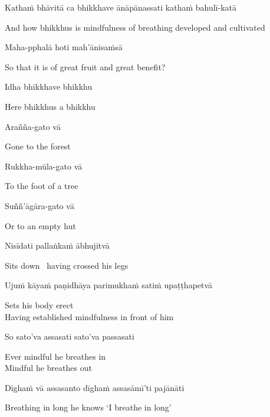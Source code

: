 Kathaṁ bhāvitā ca bhikkhave ānāpānassati kathaṁ bahulī-katā

\begin{english-hang}
  And how bhikkhus is mindfulness of breathing developed and cultivated
\end{english-hang}

Maha-pphalā hoti mah'ānisaṁsā

\begin{english}
  So that it is of great fruit and great benefit?
\end{english}

Idha bhikkhave bhikkhu

\begin{english}
  Here bhikkhus a bhikkhu
\end{english}

Arañña-gato vā

\begin{english}
  Gone to the forest
\end{english}

Rukkha-mūla-gato vā

\begin{english}
  To the foot of a tree
\end{english}

Suññ'āgāra-gato vā

\begin{english}
  Or to an empty hut
\end{english}

Nisīdati pallaṅkaṁ ābhujitvā

\begin{english}
  Sits down \breathmark\ having crossed his legs
\end{english}

Ujuṁ kāyaṁ paṇidhāya parimukhaṁ satiṁ upaṭṭhapetvā

\begin{english}
  Sets his body erect\\
  Having established mindfulness in front of him
\end{english}

So sato'va assasati sato'va passasati

\begin{english}
  Ever mindful he breathes in\\
  Mindful he breathes out
\end{english}

Dīghaṁ vā assasanto dīghaṁ assasāmī'ti pajānāti

\begin{english}
  Breathing in long he knows `I breathe in long'
\end{english}

